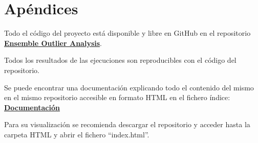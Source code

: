 \chapter*{Apéndices}

Todo el código del proyecto está disponible y libre en GitHub en el repositorio \href{https://github.com/nacheteam/Ensemble-Outlier-Analysis}{\textbf{Ensemble Outlier Analysis}}.

Todos los resultados de las ejecuciones son reproducibles con el código del repositorio.

Se puede encontrar una documentación explicando todo el contenido del mismo en el mismo repositorio accesible en formato HTML en el fichero índice: \href{https://github.com/nacheteam/Ensemble-Outlier-Analysis/tree/master/doc_build/html}{\textbf{Documentación}}

Para su visualización se recomienda descargar el repositorio y acceder hasta la carpeta HTML y abrir el fichero ``index.html''.